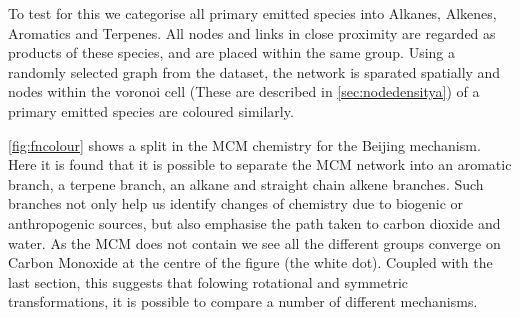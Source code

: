 To test for this we categorise all primary emitted species into Alkanes, Alkenes, Aromatics and Terpenes. All nodes and links in close proximity are regarded as products of these species, and are placed within the same group. Using a randomly selected graph from the dataset, the network is sparated spatially and nodes  within the voronoi cell (These are described in \autoref{sec:nodedensitya}) of a primary emitted species are coloured similarly.  

\autoref{fig:fncolour} shows a split in the MCM chemistry for the Beijing mechanism. Here it is found that it is possible to separate the MCM network into an aromatic branch, a terpene branch, an alkane and straight chain alkene branches. Such branches not only help us identify changes of chemistry due to biogenic or anthropogenic sources, but also emphasise the path taken to carbon dioxide and water. As the MCM does not contain  we see all the different groups converge on Carbon Monoxide at the centre of the figure (the white dot). Coupled with the last section, this suggests that folowing rotational and symmetric transformations, it is possible to compare a number of different mechanisms.
 
